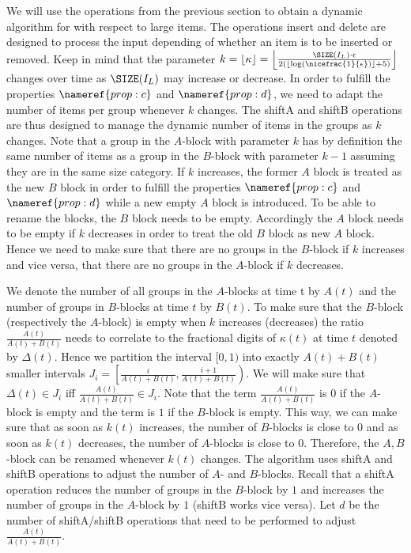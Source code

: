 We will use the operations from the previous section to obtain a dynamic algorithm for \BP with respect to large items. The operations insert and delete are designed to process the input depending of whether an item is to be inserted or removed. Keep in mind that the parameter $k = \lfloor \kappa\rfloor =  \left\lfloor\frac{\SIZE(I_L)\cdot \epsilon}{2(\lfloor \log(\nicefrac{1}{\epsilon})\rfloor +5)} \right\rfloor$ changes over time as $\SIZE(I_L)$ may increase or decrease. In order to fulfill the properties $\nameref{prop:c}$ and $\nameref{prop:d}$, we need to adapt the number of items per group whenever $k$ changes. The shiftA and shiftB operations are thus designed to manage the dynamic number of items in the groups as $k$ changes.
Note that a group in the $A$-block with parameter $k$ has by definition the same number of items as a group in the $B$-block with parameter $k-1$ assuming they are in the same size category. If $k$ increases, the former $A$ block is treated as the new $B$ block in order to fulfill the properties $\nameref{prop:c}$ and $\nameref{prop:d}$ while a new empty $A$ block is introduced. To be able to rename the blocks, the $B$ block needs to be empty. Accordingly the $A$ block needs to be empty if $k$ decreases in order to treat the old $B$ block as new $A$ block. Hence we need to make sure that there are no groups in the $B$-block if $k$ increases and vice versa, that there are no groups in the $A$-block if $k$ decreases.

We denote the number of all groups in the $A$-blocks at time t by $A(t)$ and the number of groups in $B$-blocks at time $t$ by $B(t)$. To make sure that the $B$-block (respectively the $A$-block) is empty when $k$ increases (decreases) the ratio $\frac{A(t)}{A(t)+B(t)}$ needs to correlate to the fractional digits of $\kappa(t)$ at time $t$ denoted by $\Delta(t)$. Hence we partition the interval $[0,1)$ into exactly $A(t)+B(t)$ smaller intervals $J_i=\left[\frac{i}{A(t)+B(t)},\frac{i+1}{A(t)+B(t)}\right)$. We will make sure that $\Delta(t)\in J_i$ iff $\frac{A(t)}{A(t)+B(t)}\in J_i$. Note that the term $\frac{A(t)}{A(t)+B(t)}$ is $0$ if the $A$-block is empty and the term is $1$ if the $B$-block is empty. This way, we can make sure that as soon as $k(t)$ increases, the number of $B$-blocks is close to $0$ and as soon as $k(t)$ decreases, the number of $A$-blocks is close to $0$. Therefore, the $A,B$-block can be renamed whenever $k(t)$ changes. The algorithm uses shiftA and shiftB operations to adjust the number of $A$- and $B$-blocks. Recall that a shiftA operation reduces the number of groups in the $B$-block by $1$ and increases the number of groups in the $A$-block by $1$ (shiftB works vice versa). Let $d$ be the number of shiftA/shiftB operations that need to be performed to adjust $\frac{A(t)}{A(t)+B(t)}$. 



